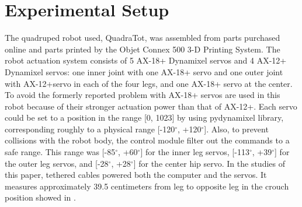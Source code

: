\section{Experimental Setup}

The quadruped robot used, QuadraTot, was assembled from parts purchased online and
parts printed by the Objet Connex 500 3-D Printing System. The robot
actuation system consists of 5 AX-18+ Dynamixel servos and 4 AX-12+
Dynamixel servos: one inner joint with one AX-18+ servo and one outer
joint with AX-12+servo in each of the four legs, and one AX-18+ servo
at the center. To avoid the formerly reported problem with  AX-18+ servos are used
in this robot because of their stronger actuation power than that of
AX-12+. Each servo could be set to a position in the range [0, 1023]
by using pydynamixel library, corresponding roughly to a physical range [-120$^\circ$,
  +120$^\circ$]. Also, to prevent collisions with the robot body, the control
module filter out the commands to a safe range. This range was [-85$^\circ$,
  +60$^\circ$] for the inner leg servos, [-113$^\circ$, +39$^\circ$] for the outer leg
servos, and [-28$^\circ$, +28$^\circ$] for the center hip servo. In the studies of
this paper, tethered cables powered both the computer and the
servos. It measures approximately 39.5 centimeters from leg to
opposite leg in the crouch position showed in . 

